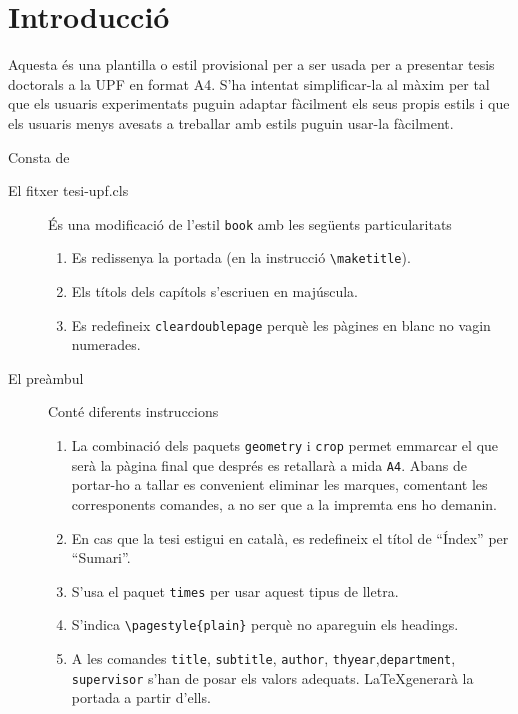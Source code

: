 \documentclass[12pt, a4paper,twoside]{tesi_upf}
\begin{document}
\chapter*{Introducció}

Aquesta és una plantilla o estil provisional per a ser usada per a presentar tesis doctorals a la UPF en format A4. S'ha intentat simplificar-la al màxim per tal que els usuaris experimentats puguin adaptar fàcilment els seus propis estils i que els usuaris menys avesats a treballar amb estils puguin usar-la fàcilment. 

Consta de
\begin{description}
\item[El fitxer tesi-upf.cls] És una modificació de l'estil {\tt book} amb les següents particularitats
  \begin{enumerate}
  \item Es redissenya la portada (en la instrucció \verb+\maketitle+).

  \item Els títols dels capítols s'escriuen en majúscula.

  \item Es redefineix {\tt cleardoublepage} perquè les pàgines en blanc no vagin numerades.
  \end{enumerate}

\item[El preàmbul] Conté diferents instruccions
  \begin{enumerate}
  \item La combinació dels paquets {\tt geometry} i {\tt crop} permet emmarcar el que serà la pàgina final que després es retallarà a mida {\tt A4}. Abans de portar-ho a tallar es convenient eliminar les marques, comentant les corresponents comandes, a no ser que a la impremta ens ho demanin.

  \item En cas que la tesi estigui en català, es redefineix el títol de ``Índex'' per ``Sumari''.

  \item S'usa el paquet {\tt times} per usar aquest tipus de lletra.

  \item S'indica \verb+\pagestyle{plain}+ perquè no apareguin els headings.

  \item  A les comandes {\tt title}, {\tt subtitle}, {\tt author}, {\tt thyear},{\tt department}, {\tt supervisor} s'han de posar els valors adequats. \LaTeX generarà la portada a partir d'ells.
  \end{enumerate}


\end{description}
\end{document}
